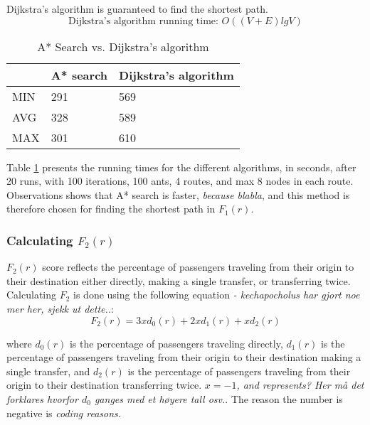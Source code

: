 Dijkstra's algorithm is guaranteed to find the shortest path\cite[p.~661]{cormen09}.
$$\text{Dijkstra's algorithm running time: } O((V + E)lg V)$$

\begin{table}[H]
    \begin{center}
        \begin{tabular}{|l|l|l|}
      \hline
      ~ & A* search & Dijkstra's algorithm\\
      \hline
        MIN & 291 & 569 \\
        AVG & 328 & 589 \\
        MAX & 301 & 610 \\
      \hline
        \end{tabular}
    \end{center}
    \caption {A* Search vs. Dijkstra's algorithm}
    \label{table:astarvsdijkstras}
\end{table}

Table \ref{table:astarvsdijkstras} presents the running times for the different algorithms, in seconds, after 20 runs, with 100 iterations, 100 ants, 4 routes,  and max 8 nodes in each route. Observations shows that A* search is faster, \emph{\color{red} because blabla}, and this method is therefore chosen for finding the shortest path in $F_1(r)$.
 

\subsubsection{Calculating $F_{2}(r)$}
$F_{2}(r)$ score reflects the percentage of passengers traveling from their origin to their destination either directly, making a single transfer, or transferring twice. Calculating $F_{2}$ is done using the following equation \emph{\color{red} -  kechapocholus har gjort noe mer her, sjekk ut dette..}:
$$F_2(r) = 3xd_0(r)+ 2xd_1(r)+ xd_2(r) $$

where  $d_0(r)$ is the percentage of passengers traveling directly, $d_1(r)$ is the percentage of passengers traveling from their origin to their destination making a single transfer, and $d_2(r)$ is the percentage of passengers traveling from their origin to their destination transferring twice. \emph{\color{red}$x=-1$, and represents? Her må det forklares hvorfor $d_0$ ganges med et høyere tall osv.}. The reason the number is negative is \emph{\color{red}coding reasons. } 


